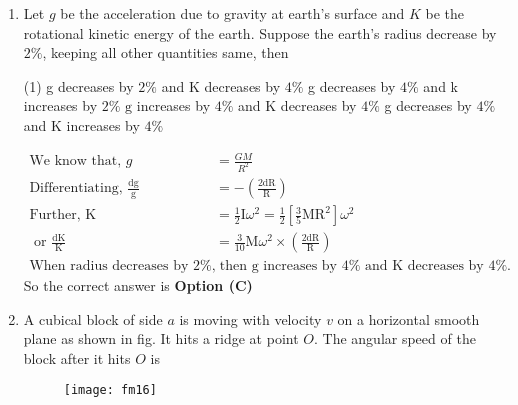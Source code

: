 \begin{enumerate}[label=\color{ocre}\textbf{\arabic*.}]
\begin{answer}
\begin{align*}
	\text{Thus} \frac{\mathrm{v}^{2}}{2}\left[\mathrm{M}+\frac{\mathrm{I}}{\mathrm{R}^{2}}\right]&=\mathrm{Mgh}=\mathrm{Mg}\left[3 \frac{\mathrm{v}^{2}}{4 \mathrm{~g}}\right]\\
	\text{or }\left[\mathrm{M}+\frac{\mathrm{I}}{\mathrm{R}^{2}}\right]&=\frac{3}{2} \mathrm{M} \\ \therefore \mathrm{I}&=\frac{\mathrm{MR}^{2}}{2}
	\intertext{\text{(b)}\quad The body may be a circular disc or a solid cylinder.}
	\end{align*}
\end{answer}
	\item Let $g$ be the acceleration due to gravity at earth's surface and $K$ be the rotational kinetic energy of the earth. Suppose the earth's radius decrease by $2 \%$, keeping all other quantities same, then
\begin{tasks}(1)
	\task[\textbf{A.}] g decreases by $2 \%$ and $\mathrm{K}$ decreases by $4 \%$
	\task[\textbf{B.}] g decreases by $4 \%$ and k increases by $2 \%$
	\task[\textbf{C.}] $\mathrm{g}$ increases by $4 \%$ and $\mathrm{K}$ decreases by $4 \%$
	\task[\textbf{D.}] g decreases by $4 \%$ and $\mathrm{K}$ increases by $4 \%$
\end{tasks}
\begin{answer}
	\begin{align*}
	\text{We know that, }g&=\frac{G M}{R^{2}}\\
	\text{Differentiating, }\frac{\mathrm{dg}}{\mathrm{g}}&=-\left(\frac{2 \mathrm{dR}}{\mathrm{R}}\right)\\
	\text{Further, }\mathrm{K}&=\frac{1}{2} \mathrm{I} \omega^{2}=\frac{1}{2}\left[\frac{3}{5} \mathrm{M} \mathrm{R}^{2}\right] \omega^{2}\\
	\text{	or }\frac{\mathrm{dK}}{\mathrm{K}}&=\frac{3}{10} \mathrm{M} \omega^{2} \times\left(\frac{2 \mathrm{dR}}{\mathrm{R}}\right)\\
	\text{When radius decreases by $2 \%$,}&\text{ then $\mathrm{g}$ increases by $4 \%$ and K decreases by $4 \%$.}
	\end{align*}
	So the correct answer is \textbf{Option (C)}
\end{answer}
	\item A cubical block of side $a$ is moving with velocity $v$ on a horizontal smooth plane as shown in fig. It hits a ridge at point $O$. The angular speed of the block after it hits $O$ is\\
\begin{figure}[H]
	\centering
	\texttt{[image: fm16]}

\end{figure}
\end{enumerate}
